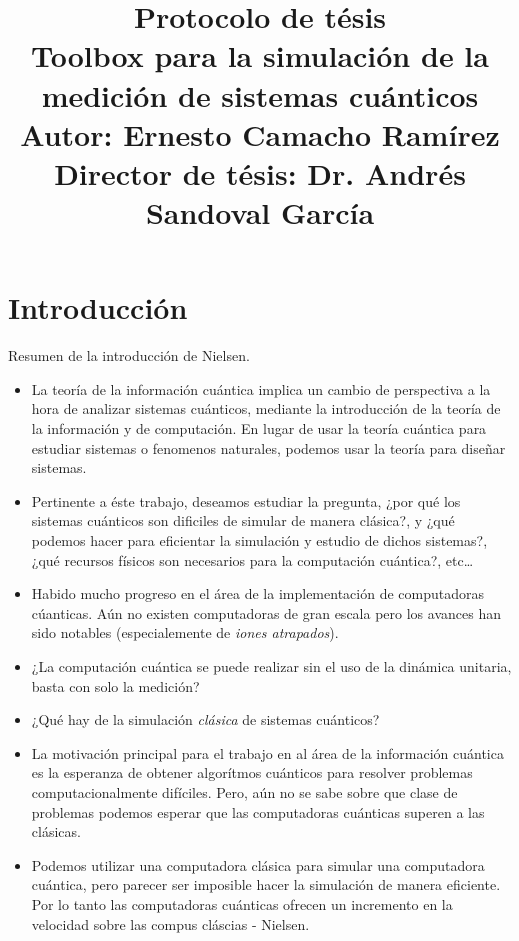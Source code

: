 \documentclass[a4paper]{article}
\title{
  \large Protocolo de tésis\\[1in]
  \huge Toolbox para la simulación de la medición de sistemas
cuánticos\\[1in]
  \large Autor: Ernesto Camacho Ramírez\\
  Director de tésis: Dr. Andrés Sandoval García
}
\author{}
\begin{document}
  \maketitle

  \newpage
  \section{Introducción}

  Resumen de la introducción de Nielsen.

  \begin{itemize}
    \item La teoría de la información cuántica implica un
      cambio de perspectiva a la hora de analizar sistemas
      cuánticos, mediante la introducción de la teoría de la
      información y de computación. En lugar de usar la
      teoría cuántica para estudiar sistemas o fenomenos
      naturales, podemos usar la teoría para diseñar
      sistemas.
    \item Pertinente a éste trabajo, deseamos estudiar la
      pregunta, ¿por qué los sistemas cuánticos son
      dificiles de simular de manera clásica?, y ¿qué
      podemos hacer para eficientar la simulación y estudio
      de dichos sistemas?, ¿qué recursos físicos son
      necesarios para la computación cuántica?, etc\ldots
    \item Habido mucho progreso en el área de la
      implementación de computadoras cúanticas. Aún no
      existen computadoras de gran escala pero los avances
      han sido notables (especialemente de \textit{iones
      atrapados}).

    \item ¿La computación cuántica se puede realizar sin el
      uso de la dinámica unitaria, basta con solo la
      medición?

    \item ¿Qué hay de la simulación \textit{clásica} de
      sistemas cuánticos?

    \item La motivación principal para el trabajo en al área
      de la información cuántica es la esperanza de obtener
      algorítmos cuánticos para resolver problemas
      computacionalmente difíciles. Pero, aún no se sabe
      sobre que clase de problemas podemos esperar que las
      computadoras cuánticas superen a las clásicas.

    \item Podemos utilizar una computadora clásica para
      simular una computadora cuántica, pero parecer ser
      imposible hacer la simulación de manera eficiente. Por
      lo tanto las computadoras cuánticas ofrecen un
      incremento en la velocidad sobre las compus cláscias -
      Nielsen. 


\end{itemize}
\end{document}
